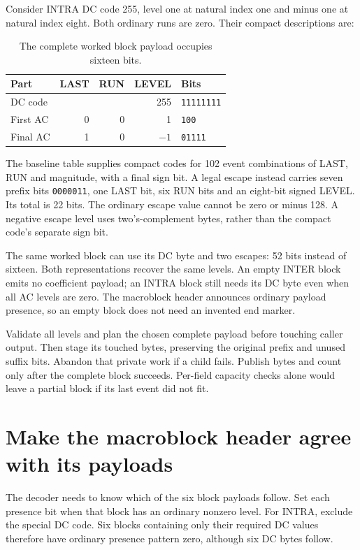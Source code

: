 Consider INTRA DC code 255, level one at natural index one and minus one at
natural index eight. Both ordinary runs are zero. Their compact descriptions are:
\begin{table}[!ht]
  \centering
  \begin{tabular}{l r r r l}
    \toprule
    Part     & LAST & RUN & LEVEL & Bits              \\
    \midrule
    DC code  &      &     & 255   & \texttt{11111111} \\
    First AC & 0    & 0   & 1     & \texttt{100}      \\
    Final AC & 1    & 0   & $-1$  & \texttt{01111}    \\
    \bottomrule
  \end{tabular}
  \caption{The complete worked block payload occupies sixteen bits.}
\end{table}

The baseline table supplies compact codes for 102 event combinations of LAST,
RUN and magnitude, with a final sign bit. A legal escape instead carries
seven prefix bits \texttt{0000011}, one LAST bit, six RUN bits and an eight-bit
signed LEVEL. Its total is 22 bits. The ordinary escape value cannot be zero or
minus 128. A negative escape level uses two's-complement bytes, rather than the
compact code's separate sign bit.

The same worked block can use its DC byte and two escapes: 52 bits instead of
sixteen. Both representations recover the same levels. An empty INTER block
emits no coefficient payload; an INTRA block still needs its DC byte even when
all AC levels are zero. The macroblock header announces ordinary payload
presence, so an empty block does not need an invented end marker.

Validate all levels and plan the chosen complete payload before touching caller
output. Then stage its touched bytes, preserving the original prefix and unused
suffix bits. Abandon that private work if a child fails. Publish bytes and count
only after the complete block succeeds. Per-field capacity checks alone would
leave a partial block if its last event did not fit.



\section{Make the macroblock header agree with its payloads}

The decoder needs to know which of the six block payloads follow. Set each
presence bit when that block has an ordinary nonzero level. For INTRA, exclude
the special DC code. Six blocks containing only their required DC values
therefore have ordinary presence pattern zero, although six DC bytes follow.

